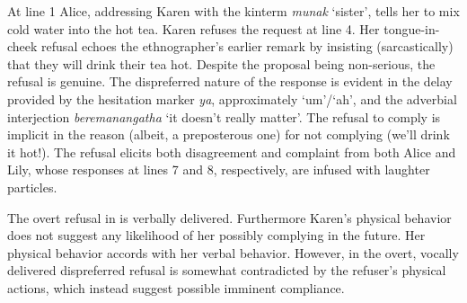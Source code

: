 \documentclass[output=paper,nonflat,colorlinks,citecolor=brown]{langsci/langscibook}
\begin{document}
At line 1 Alice, addressing Karen with the kinterm \textit{munak} ‘sister’, tells her to mix cold water into the hot tea. Karen refuses the request at line 4. Her tongue-in-cheek refusal echoes the ethnographer’s earlier remark by insisting (sarcastically) that they will drink their tea hot. Despite the proposal being non-serious, the refusal is genuine. The dispreferred nature of the response is evident in the delay provided by the hesitation marker \textit{ya}, approximately ‘um’/‘ah’, and the adverbial interjection \textit{beremanangatha} ‘it doesn’t really matter’. The refusal to comply is implicit in the reason (albeit, a preposterous one) for not complying (we’ll drink it hot!). The refusal elicits both disagreement and complaint from both Alice and Lily, whose responses at lines 7 and 8, respectively, are infused with laughter particles.

The overt refusal in  is verbally delivered. Furthermore Karen’s physical behavior does not suggest any likelihood of her possibly complying in the future. Her physical behavior accords with her verbal behavior. However, in  the overt, vocally delivered dispreferred refusal is somewhat contradicted by the refuser’s physical actions, which instead suggest possible imminent compliance.
\end{document}
